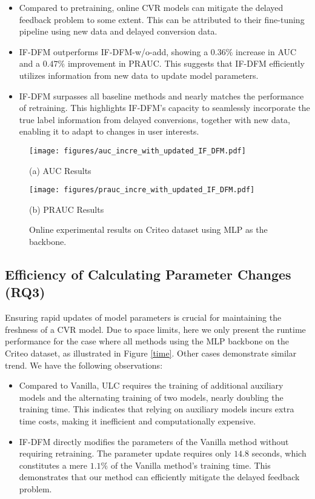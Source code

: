 \begin{itemize}[leftmargin=*]
    \item Compared to pretraining, online CVR models can mitigate the delayed feedback problem to some extent. This can be attributed to their fine-tuning pipeline using new data and delayed conversion data.
    \item IF-DFM outperforms IF-DFM-w/o-add, showing a $0.36\%$ increase in AUC and a $0.47\%$ improvement in PRAUC. This suggests that IF-DFM efficiently utilizes information from new data to update model parameters.
    \item IF-DFM surpasses all baseline methods and nearly matches the performance of retraining. This highlights IF-DFM's capacity to seamlessly incorporate the true label information from delayed conversions, together with new data, enabling it to adapt to changes in user interests.
\end{itemize}

\begin{figure}[hbtp]
\vspace{-10pt}
  \centering
  \begin{minipage}[b]{0.235\textwidth}
    \centering
\texttt{[image: figures/auc\_incre\_with\_updated\_IF\_DFM.pdf]}
    \caption*{(a) AUC Results}
  \end{minipage}
  \begin{minipage}[b]{0.235\textwidth}
    \centering
    \texttt{[image: figures/prauc\_incre\_with\_updated\_IF\_DFM.pdf]}
    \caption*{(b) PRAUC Results}
  \end{minipage}
  \caption{Online experimental results on Criteo dataset using MLP as the backbone.}
  \label{fig:incre}
  \vspace{-10pt}
\end{figure}

\subsection{Efficiency of Calculating Parameter Changes (RQ3)}
Ensuring rapid updates of model parameters is crucial for maintaining the freshness of a CVR model. Due to space limits, here we only present the runtime performance for the case where all methods using the MLP backbone on the Criteo dataset, as illustrated in Figure \ref{time}. Other cases demonstrate similar trend. We have the following observations:
\begin{itemize}[leftmargin=*]
    \item Compared to Vanilla, ULC requires the training of additional auxiliary models and the alternating training of two models, nearly doubling the training time. This indicates that relying on auxiliary models incurs extra time costs, making it inefficient and computationally expensive.
    \item IF-DFM directly modifies the parameters of the Vanilla method without requiring retraining. The parameter update requires only $14.8$ seconds, which constitutes a mere $1.1\%$ of the Vanilla method's training time. This demonstrates that our method can efficiently mitigate the delayed feedback problem.
\end{itemize}

